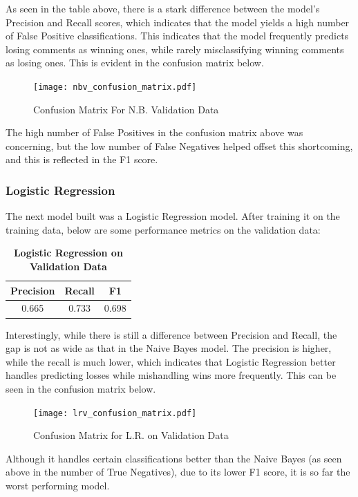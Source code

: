 \documentclass[twocolumn]{article}
\begin{document}
As seen in the table above, there is a stark difference between the model's Precision and Recall scores, which indicates that the model yields a high number of False Positive classifications. This indicates that the model frequently predicts losing comments as winning ones, while rarely misclassifying winning comments as losing ones. This is evident in the confusion matrix below.

\begin{figure}[H]
    \centering
    \texttt{[image: nbv\_confusion\_matrix.pdf]}
    \caption{Confusion Matrix For N.B. Validation Data}
\end{figure}

The high number of False Positives in the confusion matrix above was concerning, but the low number of False Negatives helped offset this shortcoming, and this is reflected in the F1 score.

\subsubsection{Logistic Regression}

The next model built was a Logistic Regression model. After training it on the training data, below are some performance metrics on the validation data:

\begin{table}[H]
\centering %
\caption{\textbf{Logistic Regression on Validation Data}} 

\begin{tabular}{ccc} 
\toprule
Precision & Recall & F1 \\ 
\midrule
0.665 & 0.733 & 0.698 \\
\bottomrule
\end{tabular}
\end{table}

Interestingly, while there is still a difference between Precision and Recall, the gap is not as wide as that in the Naive Bayes model. The precision is higher, while the recall is much lower, which indicates that Logistic Regression better handles predicting losses while mishandling wins more frequently. This can be seen in the confusion matrix below.

\begin{figure}[H]
    \centering
    \texttt{[image: lrv\_confusion\_matrix.pdf]}
    \caption{Confusion Matrix for L.R. on Validation Data}
\end{figure}

Although it handles certain classifications better than the Naive Bayes (as seen above in the number of True Negatives), due to its lower F1 score, it is so far the worst performing model.
\end{document}
